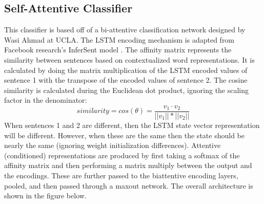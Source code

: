 \subsection{Self-Attentive Classifier}
This classifier is based off of a bi-attentive classification network designed by Wasi Ahmad at UCLA. The LSTM encoding mechanism is adapted from Facebook research's InferSent model \cite{conneau_kiela_schwenk_barrault_bordes}. The affinity matrix represents the similarity between sentences based on contextualized word representations. It is calculated by doing the matrix multiplication of the LSTM encoded values of sentence 1 with the transpose of the encoded values of sentence 2. The cosine similarity is calculated during the Euclidean dot product, ignoring the scaling factor in the denominator:
\begin{equation}
similarity = cos(\theta) = \frac{v_{1}\cdot v_{2}}{||v_{1}||*||v_{2}||}
\end{equation}
When sentences 1 and 2 are different, then the LSTM state vector representation will be different. However, when these are the same then the state should be nearly the same (ignoring weight initialization differences). Attentive (conditioned) representations are produced by first taking a softmax of the affinity matrix and then performing a matrix multiply between the output and the encodings. These are further passed to the biattentive encoding layers, pooled, and then passed through a maxout network. The overall architecture is shown in the figure below.
